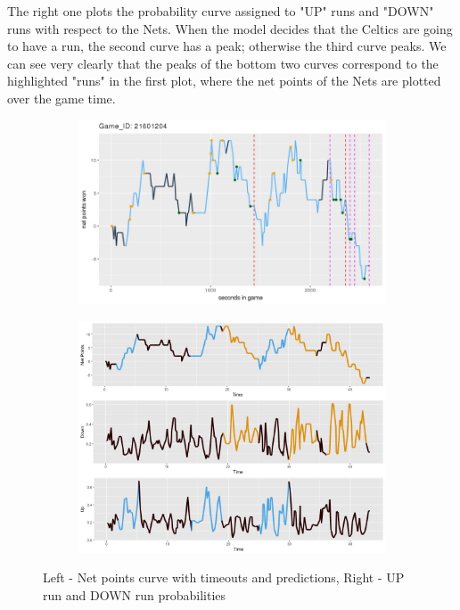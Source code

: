 \documentclass{article}
\begin{document}
The right one plots the probability curve assigned to "UP" runs and "DOWN" runs with respect to the Nets. When the model decides that the Celtics are going to have a run, the second curve has a peak; otherwise the third curve peaks. We can see very clearly that the peaks of the bottom two curves correspond to the highlighted "runs" in the first plot, where the net points of the Nets are plotted over the game time.\newline

\begin{figure}[h]
\centering
\begin{subfigure}{.5\textwidth}
  \centering
  \includegraphics[width=\linewidth]{Net_Point_21601204.jpeg}
  \label{fig:sub1}
\end{subfigure}%
\begin{subfigure}{.5\textwidth}
  \centering
  \includegraphics[width=\linewidth]{Probability_Plot.jpeg}
  \label{fig:sub2}
\end{subfigure}
\caption{Left - Net points curve with timeouts and predictions, Right - UP run and DOWN run probabilities}
\label{fig:test}
\end{figure}
\end{document}
